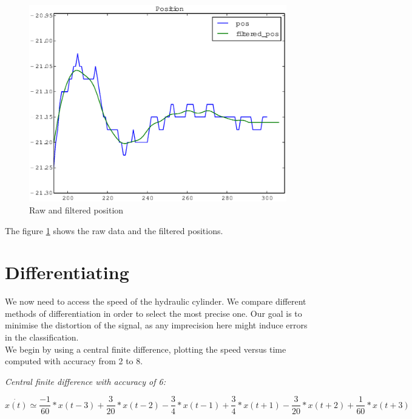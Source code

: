 \documentclass[10pt,a4paper]{report}
\begin{document}
\begin{figure}[ht]
\captionsetup{justification=centering}
	\begin{center}
		\includegraphics[scale=0.5]{Figures/position.eps}
	\end{center}
	\caption{Raw and filtered position}
	\label{fig:positions}
\end{figure}
\noindent The figure \ref{fig:positions} shows the raw data and the filtered positions.


\section{Differentiating}
\label{sec:Differentiating}
We now need to access the speed of the hydraulic cylinder. We compare different methods of differentiation in order to select the most precise one. Our goal is to minimise the distortion of the signal, as any imprecision here might induce errors in the classification.
\\
We begin by using a central finite difference, plotting the speed versus time computed with accuracy from 2 to 8.
\\
\vspace{2in}
\begin{description}
	\item{\textit{Central finite difference with accuracy of 6:}}
\end{description}
\begin{equation}
\label{eq:central_difference}
\dot{x(t)} \simeq \frac{-1}{60} * x(t-3) + \frac{3}{20} * x(t-2) -\frac{3}{4} * x(t-1) + \frac{3}{4} * x(t+1) -\frac{3}{20} * x(t+2) + \frac{1}{60} * x(t+3)
\end{equation}
\end{document}

